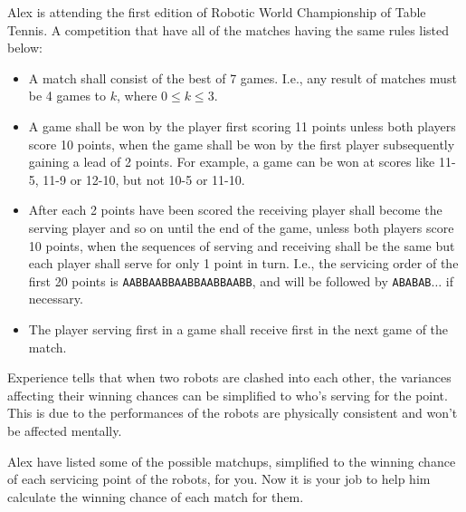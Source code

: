 Alex is attending the first edition of Robotic World Championship of Table 
Tennis. 
A competition that have all of the matches having the same rules listed below:

\begin{itemize}
\tightlist
\item A match shall consist of the best of 7 games.
      I.e., any result of matches must be 4 games to $k$, 
      where $0 \leq k \leq 3$.
\item A game shall be won by the player first scoring 11 points unless both 
      players score 10 points, when the game shall be won by the first player 
      subsequently gaining a lead of 2 points.
      For example, a game can be won at scores like 11-5, 11-9 or 12-10, 
      but not 10-5 or 11-10.
\item After each 2 points have been scored the receiving player shall become 
      the serving player and so on until the end of the game, unless both 
      players score 10 points, when the sequences of serving and receiving 
      shall be the same but each player shall serve for only 1 point in turn. 
      I.e., the servicing order of the first 20 points is 
      \verb+AABBAABBAABBAABBAABB+, and will be followed by \verb+ABABAB+$\ldots$
      if necessary.
\item The player serving first in a game shall receive first in the next game 
      of the match.
\end{itemize}

Experience tells that when two robots are clashed into each other, 
the variances affecting their winning chances can be simplified to 
who's serving for the point. This is due to the performances of the 
robots are physically consistent and won't be affected mentally.

Alex have listed some of the possible matchups, simplified to the winning 
chance of each servicing point of the robots, for you. Now it is your job to 
help him calculate the winning chance of each match for them.
